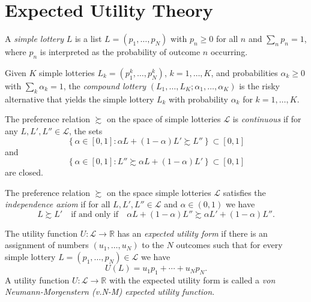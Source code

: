 \addtocounter{section}{1}

\section{Expected Utility Theory}

\begin{defn}
    A \emph{simple lottery} $L$ is a list $L = (p_1, \dots, p_N)$ with $p_n \geq 0$ for all $n$ and $\sum_n p_n = 1$, where $p_n$ is interpreted as the probability of outcome $n$ occurring.
\end{defn}

\begin{defn}
    Given $K$ simple lotteries $L_k = (p_1^k, \dots, p_N^k)$, $k = 1, \dots, K$, and probabilities $\alpha_k \geq 0$ with $\sum_k \alpha_k = 1$, the \emph{compound lottery} $(L_1, \dots, L_K; \alpha_1, \dots, \alpha_K)$ is the risky alternative that yields the simple lottery $L_k$ with probability $\alpha_k$ for $k = 1, \dots, K$.
\end{defn}

\begin{defn}
    The preference relation $\succsim$ on the space of simple lotteries $\mathscr{L}$ is \emph{continuous} if for any $L, L', L'' \in \mathscr{L}$, the sets
    \begin{equation*}
        \left\{ \alpha \in [0, 1]: \alpha L + (1 - \alpha) L' \succsim L'' \right\} \subset [0, 1]
    \end{equation*}
    and
    \begin{equation*}
        \left\{ \alpha \in [0, 1]: L'' \succsim \alpha L + (1 - \alpha) L' \right\} \subset [0, 1]
    \end{equation*}
    are closed.
\end{defn}

\begin{defn}
    The preference relation $\succsim$ on the space simple lotteries $\mathscr{L}$ satisfies the \emph{independence axiom} if for all $L, L', L'' \in \mathscr{L}$ and $\alpha \in (0, 1)$ we have
    \begin{equation*}
        L \succsim L' \quad \text{if and only if} \quad \alpha L + (1 - \alpha) L'' \succsim \alpha L' + (1 - \alpha) L''.
    \end{equation*}
\end{defn}

\begin{defn}
    The utility function $U : \mathscr{L} \to \mathbb{R}$ has an \emph{expected utility form} if there is an assignment of numbers $(u_1, \dots, u_N)$ to the $N$ outcomes such that for every simple lottery $L = (p_1, \dots, p_N) \in \mathscr{L}$ we have
    \begin{equation*}
        U(L) = u_1 p_1 + \cdots + u_N p_N.
    \end{equation*}
    A utility function $U : \mathscr{L} \to \mathbb{R}$ with the expected utility form is called a \emph{von Neumann-Morgenstern (v.N-M) expected utility function}.
\end{defn}

